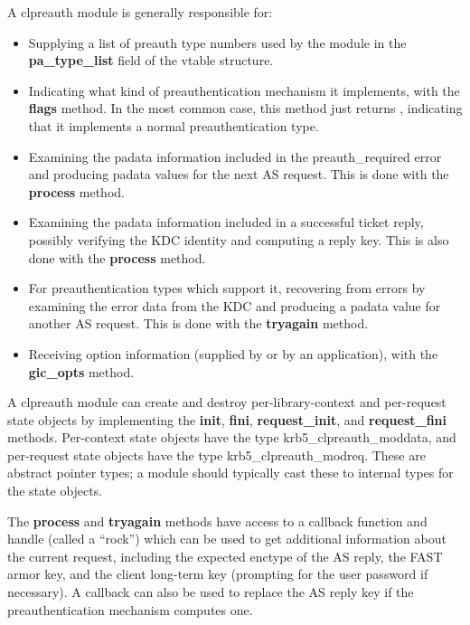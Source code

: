 \documentclass[letterpaper,10pt,english]{sphinxmanual}
\begin{document}
A clpreauth module is generally responsible for:
\begin{itemize}
\item {} 
Supplying a list of preauth type numbers used by the module in the
\textbf{pa\_type\_list} field of the vtable structure.

\item {} 
Indicating what kind of preauthentication mechanism it implements,
with the \textbf{flags} method.  In the most common case, this method
just returns , indicating that it implements a normal
preauthentication type.

\item {} 
Examining the padata information included in the preauth\_required
error and producing padata values for the next AS request.  This is
done with the \textbf{process} method.

\item {} 
Examining the padata information included in a successful ticket
reply, possibly verifying the KDC identity and computing a reply
key.  This is also done with the \textbf{process} method.

\item {} 
For preauthentication types which support it, recovering from errors
by examining the error data from the KDC and producing a padata
value for another AS request.  This is done with the \textbf{tryagain}
method.

\item {} 
Receiving option information (supplied by  or by an
application), with the \textbf{gic\_opts} method.

\end{itemize}

A clpreauth module can create and destroy per-library-context and
per-request state objects by implementing the \textbf{init}, \textbf{fini},
\textbf{request\_init}, and \textbf{request\_fini} methods.  Per-context state
objects have the type krb5\_clpreauth\_moddata, and per-request state
objects have the type krb5\_clpreauth\_modreq.  These are abstract
pointer types; a module should typically cast these to internal
types for the state objects.

The \textbf{process} and \textbf{tryagain} methods have access to a callback
function and handle (called a ``rock'') which can be used to get
additional information about the current request, including the
expected enctype of the AS reply, the FAST armor key, and the client
long-term key (prompting for the user password if necessary).  A
callback can also be used to replace the AS reply key if the
preauthentication mechanism computes one.
\end{document}

